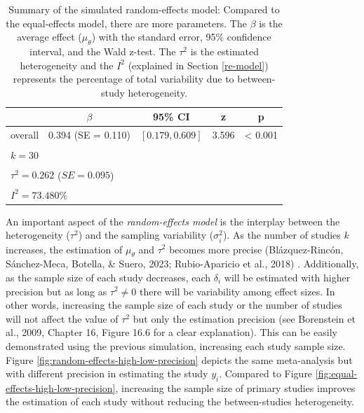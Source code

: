 \documentclass[
  man,floatsintext]{apa6}
\begin{document}
\scriptsize

\begin{table}[H]

\caption{\label{tab:res-random-effects}Summary of the simulated random-effects model: Compared to the equal-effects model, there are more parameters. The \(\beta\) is the average effect (\(\mu_{\theta}\)) with the standard error, 95\% confidence interval, and the Wald z-test. The \(\tau^{2}\) is the estimated heterogeneity and the \(I^{2}\) (explained in Section \ref{re-model}) represents the percentage of total variability due to between-study heterogeneity.}
\centering
\fontsize{9}{11}\selectfont
\begin{tabular}[t]{ccccc}
\toprule
 & $\beta$ & 95\% CI & z & p\\
\midrule
overall & 0.394 (SE = 0.110) & $[0.179, 0.609]$ & 3.596 & < 0.001\\
\bottomrule
\multicolumn{5}{l}{\textsuperscript{} $k = 30$}\\
\multicolumn{5}{l}{\textsuperscript{} $\tau^2 = 0.262$ ($SE = 0.095$)}\\
\multicolumn{5}{l}{\textsuperscript{} $I^2 = 73.480\%$}\\
\end{tabular}
\end{table}

\normalsize

An important aspect of the \emph{random-effects model} is the interplay between the heterogeneity (\(\tau^{2}\)) and the sampling variability (\(\sigma_{i}^{2}\)). As the number of studies \(k\) increases, the estimation of \(\mu_{\theta}\) and \(\tau^{2}\) becomes more precise (Blázquez-Rincón, Sánchez-Meca, Botella, \& Suero, 2023; Rubio-Aparicio et al., 2018) . Additionally, as the sample size of each study decreases, each \(\delta_{i}\) will be estimated with higher precision but as long as \(\tau^{2} \neq 0\) there will be variability among effect sizes. In other words, increasing the sample size of each study or the number of studies will not affect the value of \(\tau^{2}\) but only the estimation precision (see Borenstein et al., 2009, Chapter 16, Figure 16.6 for a clear explanation). This can be easily demonstrated using the previous simulation, increasing each study sample size. Figure \ref{fig:random-effects-high-low-precision} depicts the same meta-analysis but with different precision in estimating the study \(y_{i}\). Compared to Figure \ref{fig:equal-effects-high-low-precision}, increasing the sample size of primary studies improves the estimation of each study without reducing the between-studies heterogeneity.
\end{document}
